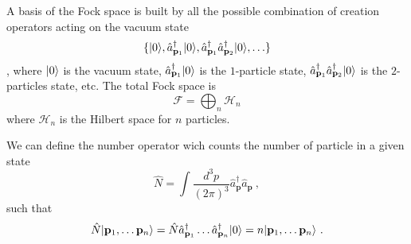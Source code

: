     A basis of the Fock space is built by all the possible combination of creation operators acting on the vacuum state 
    \begin{equation*}
        \{\vert0\rangle, \hat a_{\mathbf p_1}^\dagger \vert0\rangle, \hat a_{\mathbf p_1}^\dagger \hat a_{\mathbf p_2}^\dagger \vert0\rangle, \ldots \} 
    \end{equation*},
    where $\vert0\rangle$ is the vacuum state, $\hat a_{\mathbf p_1}^\dagger \vert0\rangle$ is the $1$-particle state, $\hat a_{\mathbf p_1}^\dagger \hat a_{\mathbf p_2}^\dagger \vert0\rangle$ is the $2$-particles state, etc. The total Fock space is 
    \begin{equation*}
        \mathcal F = \bigoplus_n \mathcal H_n
    \end{equation*}
    where $\mathcal H_n$ is the Hilbert space for $n$ particles.

    We can define the number operator wich counts the number of particle in a given state 
    \begin{equation}\label{nop}
        \hat N = \int \frac{d^3 p}{(2\pi)^3} \hat a_{\mathbf p}^\dagger \hat a_{\mathbf p} ~,
    \end{equation}
    such that 
    \begin{equation*}
        \hat N \vert\mathbf p_1, \ldots \mathbf p_n\rangle = \hat N \hat a_{\mathbf p_1}^\dagger \ldots \hat a_{\mathbf p_n}^\dagger \vert0\rangle =  n \vert\mathbf p_1, \ldots \mathbf p_n\rangle ~.
    \end{equation*}

